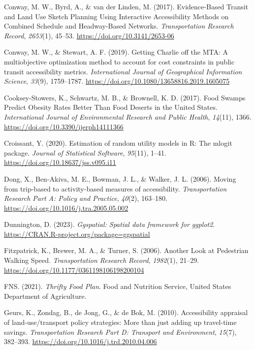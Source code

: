 \documentclass[
  letterpaper,
  number,
  review,
  doubleblind,
  3p]{elsarticle}
\newlength{\cslhangindent}
\newenvironment{CSLReferences}[2] %
 {\begin{list}{}{%
  \setlength{\itemindent}{0pt}
  \setlength{\leftmargin}{0pt}
  \setlength{\parsep}{0pt}
  \ifodd #1
   \setlength{\leftmargin}{\cslhangindent}
   \setlength{\itemindent}{-1\cslhangindent}
  \fi
  \setlength{\itemsep}{#2\baselineskip}}}
 {\end{list}}
\begin{document}
\begin{CSLReferences}{1}{0}
Conway, M. W., Byrd, A., \& van der Linden, M. (2017). Evidence-{Based
Transit} and {Land Use Sketch Planning Using Interactive Accessibility
Methods} on {Combined Schedule} and {Headway-Based Networks}.
\emph{Transportation Research Record}, \emph{2653}(1), 45--53.
\url{https://doi.org/10.3141/2653-06}

Conway, M. W., \& Stewart, A. F. (2019). Getting {Charlie} off the
{MTA}: A multiobjective optimization method to account for cost
constraints in public transit accessibility metrics. \emph{International
Journal of Geographical Information Science}, \emph{33}(9), 1759--1787.
\url{https://doi.org/10.1080/13658816.2019.1605075}

Cooksey-Stowers, K., Schwartz, M. B., \& Brownell, K. D. (2017). Food
{Swamps Predict Obesity Rates Better Than Food Deserts} in the {United
States}. \emph{International Journal of Environmental Research and
Public Health}, \emph{14}(11), 1366.
\url{https://doi.org/10.3390/ijerph14111366}

Croissant, Y. (2020). Estimation of random utility models in {R}: The
{mlogit} package. \emph{Journal of Statistical Software}, \emph{95}(11),
1--41. \url{https://doi.org/10.18637/jss.v095.i11}

Dong, X., Ben-Akiva, M. E., Bowman, J. L., \& Walker, J. L. (2006).
Moving from trip-based to activity-based measures of accessibility.
\emph{Transportation Research Part A: Policy and Practice},
\emph{40}(2), 163--180. \url{https://doi.org/10.1016/j.tra.2005.05.002}

Dunnington, D. (2023). \emph{Ggspatial: Spatial data framework for
ggplot2}. \url{https://CRAN.R-project.org/package=ggspatial}

Fitzpatrick, K., Brewer, M. A., \& Turner, S. (2006). Another {Look} at
{Pedestrian Walking Speed}. \emph{Transportation Research Record},
\emph{1982}(1), 21--29.
\url{https://doi.org/10.1177/0361198106198200104}

FNS. (2021). \emph{Thrifty {Food Plan}}. {Food and Nutrition Service,
United States Department of Agriculture}.

Geurs, K., Zondag, B., de Jong, G., \& de Bok, M. (2010). Accessibility
appraisal of land-use/transport policy strategies: {More} than just
adding up travel-time savings. \emph{Transportation Research Part D:
Transport and Environment}, \emph{15}(7), 382--393.
\url{https://doi.org/10.1016/j.trd.2010.04.006}


\end{CSLReferences}
\end{document}
